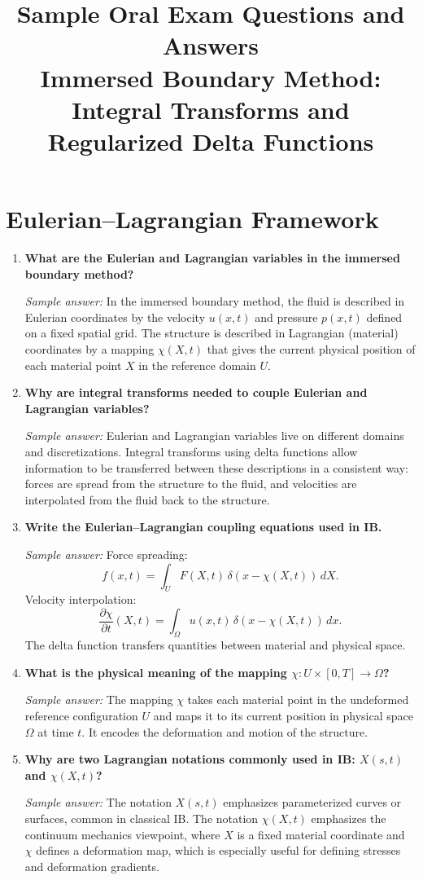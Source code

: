 \documentclass[11pt]{article}
\title{Sample Oral Exam Questions and Answers\\
Immersed Boundary Method: Integral Transforms and Regularized Delta Functions}
\author{}
\date{}
\begin{document}
\maketitle

\section*{Eulerian--Lagrangian Framework}

\begin{enumerate}[label=\arabic*.]

\item \textbf{What are the Eulerian and Lagrangian variables in the immersed boundary method?}

\textit{Sample answer:}  
In the immersed boundary method, the fluid is described in Eulerian coordinates by the velocity $u(x,t)$ and pressure $p(x,t)$ defined on a fixed spatial grid.  
The structure is described in Lagrangian (material) coordinates by a mapping $\chi(X,t)$ that gives the current physical position of each material point $X$ in the reference domain $U$.

\item \textbf{Why are integral transforms needed to couple Eulerian and Lagrangian variables?}

\textit{Sample answer:}  
Eulerian and Lagrangian variables live on different domains and discretizations. Integral transforms using delta functions allow information to be transferred between these descriptions in a consistent way: forces are spread from the structure to the fluid, and velocities are interpolated from the fluid back to the structure.

\item \textbf{Write the Eulerian--Lagrangian coupling equations used in IB.}

\textit{Sample answer:}  
Force spreading:
\[
f(x,t) = \int_U F(X,t)\,\delta(x-\chi(X,t))\,dX.
\]
Velocity interpolation:
\[
\frac{\partial \chi}{\partial t}(X,t) = \int_\Omega u(x,t)\,\delta(x-\chi(X,t))\,dx.
\]
The delta function transfers quantities between material and physical space.

\item \textbf{What is the physical meaning of the mapping $\chi : U \times [0,T] \to \Omega$?}

\textit{Sample answer:}  
The mapping $\chi$ takes each material point in the undeformed reference configuration $U$ and maps it to its current position in physical space $\Omega$ at time $t$. It encodes the deformation and motion of the structure.

\item \textbf{Why are two Lagrangian notations commonly used in IB: $X(s,t)$ and $\chi(X,t)$?}

\textit{Sample answer:}  
The notation $X(s,t)$ emphasizes parameterized curves or surfaces, common in classical IB.  
The notation $\chi(X,t)$ emphasizes the continuum mechanics viewpoint, where $X$ is a fixed material coordinate and $\chi$ defines a deformation map, which is especially useful for defining stresses and deformation gradients.

\end{enumerate}
\end{document}
